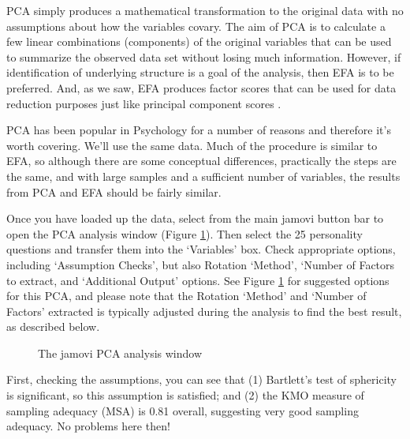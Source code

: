 PCA simply produces a mathematical transformation to the original data with no assumptions about how the variables covary. The aim of PCA is to calculate a few linear combinations (components) of the original variables that can be used to summarize the observed data set without losing much information. However, if identification of underlying structure is a goal of the analysis, then EFA is to be preferred. And, as we saw, EFA produces factor scores that can be used for data reduction purposes just like principal component scores \parencite{Fabrigar1999}.

PCA has been popular in Psychology for a number of reasons and therefore it's worth covering. We'll use the same  data. Much of the procedure is similar to EFA, so although there are some conceptual differences, practically the steps are the same, and with large samples and a sufficient number of variables, the results from PCA and EFA should be fairly similar. 


Once you have loaded up the  data, select  from the main jamovi button bar to open the PCA analysis window (Figure \ref{fig:pca1}). Then select the 25 personality questions and transfer them into the ‘Variables’ box. Check appropriate options, including ‘Assumption Checks’, but also Rotation ‘Method’, ‘Number of Factors to extract, and ‘Additional Output’ options. See Figure \ref{fig:pca1} for suggested options for this  PCA, and please note that the Rotation ‘Method’ and ‘Number of Factors’ extracted is typically adjusted during the analysis to find the best result, as described below.

\begin{figure}[!htb]
\begin{center}
\caption{The jamovi PCA analysis window}
\label{fig:pca1}
\HR
\end{center}
\end{figure}

First, checking the assumptions, you can see that (1) Bartlett’s test of sphericity is significant, so this assumption is satisfied; and (2) the KMO measure of sampling adequacy (MSA) is 0.81 overall, suggesting very good sampling adequacy. No problems here then! 

